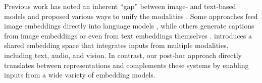  Previous work has noted an inherent ``gap” between image- and text-based models \citep{liang2022mindgapunderstandingmodality} and proposed various ways to unify the modalities \citep{song2023bridgegapmodalitiescomprehensive}. Some approaches feed image embeddings directly into language models \citep{koh2023fromage, wang2023visionllm, dong2024dreamllmsynergisticmultimodalcomprehension, liu2023visualinstructiontuning}, while others generate captions from image embeddings \citep{mokady2021clipcap} or even from text embeddings themselves \citep{morris2023textembeddingsrevealalmost}. \citep{girdhar2023imagebind} introduces a shared embedding space that integrates inputs from multiple modalities, including text, audio, and vision. In contrast, our post-hoc approach directly translates between representations and complements these systems by enabling inputs from a wide variety of embedding models.